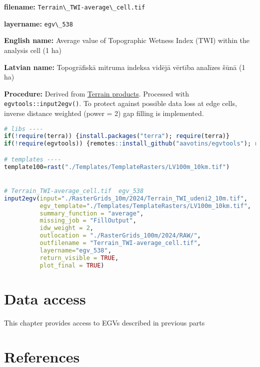 \documentclass[
]{book}
\newcommand{\passthrough}[1]{#1}
\begin{document}
\textbf{filename:} \passthrough{\lstinline!Terrain\_TWI-average\_cell.tif!}

\textbf{layername:} \passthrough{\lstinline!egv\_538!}

\textbf{English name:} Average value of Topographic Wetness Index (TWI) within the analysis cell (1 ha)

\textbf{Latvian name:} Topogrāfiskā mitruma indeksa vidējā vērtība analīzes šūnā (1 ha)

\textbf{Procedure:} Derived from \hyperref[Ch05.01]{Terrain products}. Processed
with \passthrough{\lstinline!egvtools::input2egv()!}. To protect against
possible data loss at edge cells, inverse distance weighted (power = 2) gap filling
is implemented.

\begin{lstlisting}[language=R]
# libs ----
if(!require(terra)) {install.packages("terra"); require(terra)}
if(!require(egvtools)) {remotes::install_github("aavotins/egvtools"); require(egvtools)}

# templates ----
template100=rast("./Templates/TemplateRasters/LV100m_10km.tif")


# Terrain_TWI-average_cell.tif  egv_538
input2egv(input="./RasterGrids_10m/2024/Terrain_TWI_udeni2_10m.tif",
          egv_template="./Templates/TemplateRasters/LV100m_10km.tif",
          summary_function = "average",
          missing_job = "FillOutput",
          idw_weight = 2,
          outlocation = "./RasterGrids_100m/2024/RAW/",
          outfilename = "Terrain_TWI-average_cell.tif",
          layername="egv_538",
          return_visible = TRUE,
          plot_final = TRUE)
\end{lstlisting}

\chapter{Data access}\label{Ch07}

This chapter provides access to EGVs described in previous parts

\chapter*{References}\label{references}
\end{document}
